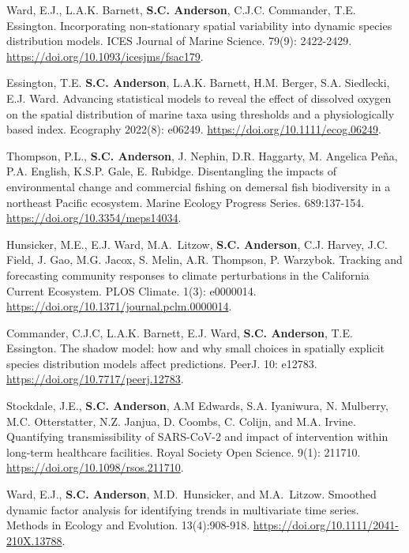 \begin{description}
\tightlist
\item[2022]
Ward, E.J., L.A.K. Barnett, \textbf{S.C. Anderson}, C.J.C. Commander,
T.E. Essington. Incorporating non-stationary spatial variability into
dynamic species distribution models. ICES Journal of Marine Science.
79(9): 2422-2429. \url{https://doi.org/10.1093/icesjms/fsac179}.
\item[2022]
Essington, T.E. \textbf{S.C. Anderson}, L.A.K. Barnett, H.M. Berger,
S.A. Siedlecki, E.J. Ward. Advancing statistical models to reveal the
effect of dissolved oxygen on the spatial distribution of marine taxa
using thresholds and a physiologically based index. Ecography 2022(8):
e06249. \url{https://doi.org/10.1111/ecog.06249}.
\item[2022]
Thompson, P.L., \textbf{S.C. Anderson}, J. Nephin, D.R. Haggarty, M.
Angelica Peña, P.A. English, K.S.P. Gale, E. Rubidge. Disentangling the
impacts of environmental change and commercial fishing on demersal fish
biodiversity in a northeast Pacific ecosystem. Marine Ecology Progress
Series. 689:137-154. \url{https://doi.org/10.3354/meps14034}.
\item[2022]
Hunsicker, M.E., E.J. Ward, M.A.\ Litzow, \textbf{S.C. Anderson}, C.J.
Harvey, J.C. Field, J. Gao, M.G. Jacox, S. Melin, A.R. Thompson, P.
Warzybok. Tracking and forecasting community responses to climate
perturbations in the California Current Ecosystem. PLOS Climate. 1(3):
e0000014. \url{https://doi.org/10.1371/journal.pclm.0000014}.
\item[2022]
Commander, C.J.C, L.A.K. Barnett, E.J. Ward, \textbf{S.C. Anderson},
T.E. Essington. The shadow model: how and why small choices in spatially
explicit species distribution models affect predictions. PeerJ. 10:
e12783. \url{https://doi.org/10.7717/peerj.12783}.
\item[2022]
Stockdale, J.E., \textbf{S.C. Anderson}, A.M Edwards, S.A. Iyaniwura, N.
Mulberry, M.C. Otterstatter, N.Z. Janjua, D. Coombs, C. Colijn, and M.A.
Irvine. Quantifying transmissibility of SARS-CoV-2 and impact of
intervention within long-term healthcare facilities. Royal Society Open
Science. 9(1): 211710. \url{https://doi.org/10.1098/rsos.211710}.
\item[2022]
Ward, E.J., \textbf{S.C. Anderson}, M.D.\ Hunsicker, and M.A.\ Litzow.
Smoothed dynamic factor analysis for identifying trends in multivariate
time series. Methods in Ecology and Evolution. 13(4):908-918.
\url{https://doi.org/10.1111/2041-210X.13788}.
\item[2021]

\end{description}
